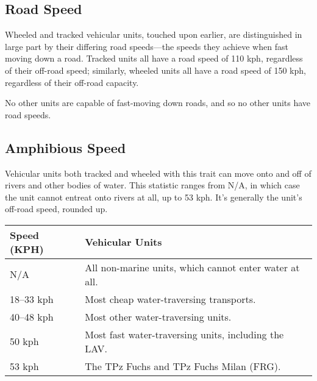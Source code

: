 \documentclass{article}
\begin{document}
\subsection{Road Speed}

Wheeled and tracked vehicular units, touched upon earlier, are distinguished in
large part by their differing road speeds---the speeds they achieve when fast moving
down a road. Tracked units all have a road speed of 110 kph, regardless of their
off-road speed; similarly, wheeled units all have a road speed of 150 kph,
regardless of their off-road capacity.

No other units are capable of fast-moving down roads, and so no other units have
road speeds.


\subsection{Amphibious Speed}

Vehicular units both tracked and wheeled with this trait can move onto and off
of rivers and other bodies of water. This statistic ranges from N/A, in which
case the unit cannot entreat onto rivers at all, up to 53 kph. It's generally
the unit's off-road speed, rounded up.

\begin{center}
    \begin{tabular}{ | l | p{9cm} | }
    \hline
    Speed (KPH) & Vehicular Units \\ \hline
    N/A & All non-marine units, which cannot enter water at all. \\
    18--33 kph & Most cheap water-traversing transports.\\
    40--48 kph & Most other water-traversing units.\\
    50 kph & Most fast water-traversing units, including the LAV.\\
    53 kph & The TPz Fuchs and TPz Fuchs Milan (FRG).\\
    \hline
    \end{tabular}
\end{center}
\end{document}
